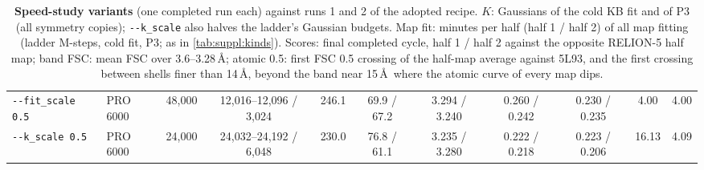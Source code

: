 \begin{table}[t]
{\begin{tabular}{@{}llrcrcccccc@{}}
\texttt{-{}-fit\_scale 0.5} & PRO 6000 & 48{,}000 & 12{,}016--12{,}096 / 3{,}024 & 246.1 & 69.9 / 67.2 & 3.294 / 3.240 & 0.260 / 0.242 & 0.230 / 0.235 & 4.00 & 4.00 \\
\texttt{-{}-k\_scale 0.5} & PRO 6000 & 24{,}000 & 24{,}032--24{,}192 / 6{,}048 & 230.0 & 76.8 / 61.1 & 3.235 / 3.280 & 0.222 / 0.218 & 0.223 / 0.206 & 16.13 & 4.09 \\
\bottomrule
\end{tabular}}
\caption{\textbf{Speed-study variants} (one completed run each) against runs 1 and 2 of the adopted recipe. $K$: Gaussians of the cold KB fit and of P3 (all symmetry copies); \texttt{-{}-k\_scale} also halves the ladder's Gaussian budgets. Map fit: minutes per half (half 1 / half 2) of all map fitting (ladder M-steps, cold fit, P3; as in \cref{tab:suppl:kinds}). Scores: final completed cycle, half 1 / half 2 against the opposite RELION-5 half map; band FSC: mean FSC over 3.6--3.28\,\AA; atomic 0.5: first FSC 0.5 crossing of the half-map average against 5L93, and the first crossing between shells finer than 14\,\AA, beyond the band near 15\,\AA\ where the atomic curve of every map dips.}
\label{tab:suppl:speed}
\end{table}
